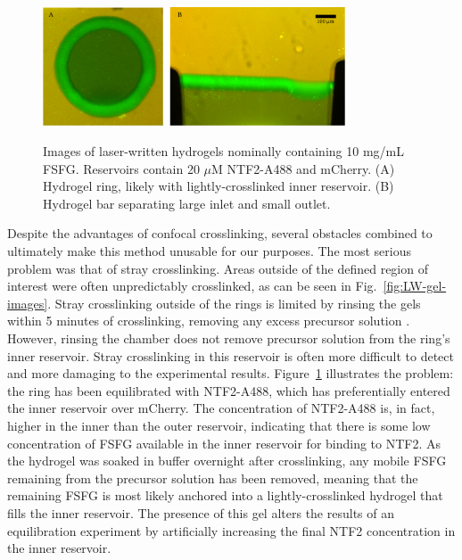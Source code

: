 \begin{figure} %
\caption[NTF2 binding to confocal-crosslinked FSFG hydrogels.]{Images of laser-written hydrogels nominally containing 10 mg/mL FSFG. Reservoirs contain 20 $\mu$M NTF2-A488 and mCherry. (A) Hydrogel ring, likely with lightly-crosslinked inner reservoir. (B) Hydrogel bar separating large inlet and small outlet.}
\centering
\includegraphics[width=0.8\textwidth]{figs/ch03/example-LW-gels-NTF2}
\label{fig:LW-NTF2-images}
\end{figure} %

Despite the advantages of confocal crosslinking, several obstacles combined to ultimately make this method unusable for our purposes.  The most serious problem was that of stray crosslinking.  Areas outside of the defined region of interest were often unpredictably crosslinked, as can be seen in Fig.~\ref{fig:LW-gel-images}.  Stray crosslinking outside of the rings is limited by rinsing the gels within 5 minutes of crosslinking, removing any excess precursor solution \cite{paustian13}.  However, rinsing the chamber does not remove precursor solution from the ring's inner reservoir.  Stray crosslinking in this reservoir is often more difficult to detect and more damaging to the experimental results. Figure~\ref{fig:LW-NTF2-images} illustrates the problem: the ring has been equilibrated with NTF2-A488, which has preferentially entered the inner reservoir over mCherry.  The concentration of NTF2-A488 is, in fact, higher in the inner than the outer reservoir, indicating that there is some low concentration of FSFG available in the inner reservoir for binding to NTF2.  As the hydrogel was soaked in buffer overnight after crosslinking, any mobile FSFG remaining from the precursor solution has been removed, meaning that the remaining FSFG is most likely anchored into a lightly-crosslinked hydrogel that fills the inner reservoir.  The presence of this gel alters the results of an equilibration experiment by artificially increasing the final NTF2 concentration in the inner reservoir.

